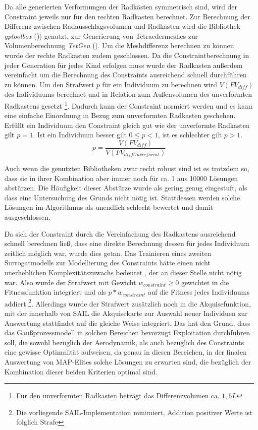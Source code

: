 Da alle generierten Verformungen der Radkästen symmetrisch sind, wird der Constraint jeweils nur für den rechten Radkasten berechnet.
Zur Berechnung der Differenz zwischen Radausschlagsvolumen und Radkasten wird die Bibliothek \textit{gptoolbox} ()\cite{gptoolbox.b}) genutzt, zur Generierung von Tetraedermeshes zur Volumenberechnung \textit{TetGen} (\cite{Si.2015}).
Um die Meshdifferenz berechnen zu können wurde der rechte Radkasten zudem geschlossen.
Da die Constraintberechnung in jeder Generation für jedes Kind erfolgen muss wurde der Radkasten außerdem vereinfacht um die Berechnung  des Constraints ausreichend schnell durchführen zu können.
Um den Strafwert $p$ für ein Individuum zu berechnen wird $V(FV_{diff})$ des Individuums berechnet und in Relation zum Außenvolumen des unverformten Radkastens gesetzt \footnote{Für den unverformten Radkasten beträgt das Differenzvolumen ca. $1,6L$}.
Dadurch kann der Constraint normiert werden und es kann eine einfache Einordnung in Bezug zum unverformten Radkasten geschehen.
Erfüllt ein Individuum den Constraint gleich gut wie der unverformte Radkasten gilt $p=1$.
Ist ein Individuum besser gilt $0\leq p < 1$, ist es schlechter gilt $p>1$.
\[
	p = \frac{V(FV_{diff})}{V(FV_{diffUnverformt})}
\]

Auch wenn die genutzten Bibliotheken zwar recht robust sind ist es trotzdem so, dass sie in ihrer Kombination aber immer noch für ca. 1 aus 10000 Lösungen abstürzen.
Die Häufigkeit dieser Abstürze wurde als gering genug eingestuft, als dass eine Untersuchung des Grunds nicht nötig ist.
Stattdessen werden solche Lösungen im Algorithmus als unendlich schlecht bewertet und damit ausgeschlossen.

Da sich der Constraint durch die Vereinfachung des Radkastens ausreichend schnell berechnen ließ, dass eine direkte Berechnung dessen für jedes Individuum zeitlich möglich war, wurde dies getan.
Das Trainieren eines zweiten Surrogatmodells zur Modellierung des Constraints hätte einen nicht unerheblichen Komplexitätszuwachs bedeutet , der an dieser Stelle nicht nötig war.
Also wurde der Strafwert mit Gewicht $w_{constraint} \geq 0$ gewichtet in die Fitnessfunktion integriert und als $p*w_{constraint}$ auf die Fitness jedes Individuums addiert
\footnote{Die vorliegende SAIL-Implementation minimiert, Addition positiver Werte ist folglich Strafe}.
Allerdings wurde der Strafwert zusätzlich noch in die Akquisefunktion, mit der innerhalb von SAIL die Akquisekarte zur Auswahl neuer Individuen zur Auswertung stattfindet auf die gleiche Weise integriert. Das hat den Grund, dass das Gaußprozessmodell in solchen Bereichen bevorzugt Exploitation durchführen soll, die sowohl bezüglich der Aerodynamik, als auch bezüglich des Constraints eine gewisse Optimalität aufweisen, da genau in diesen Bereichen, in der finalen Auswertung von MAP-Elites solche Lösungen zu erwarten sind, die bezüglich der Kombination dieser beiden Kriterien optimal sind.


